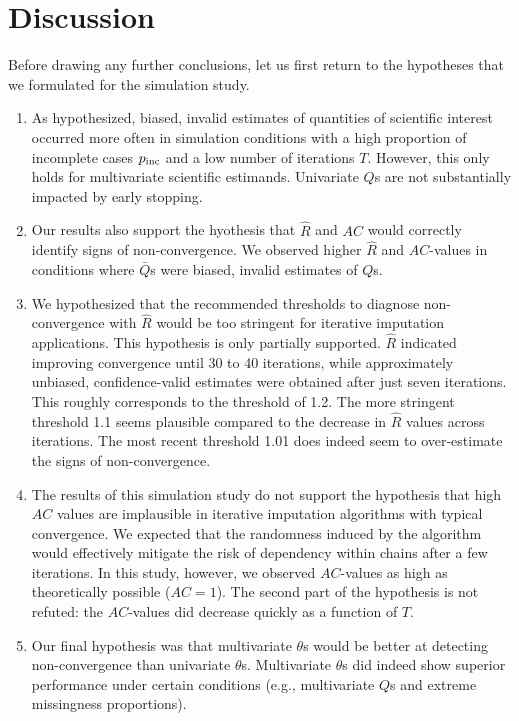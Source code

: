 \documentclass[Royal,times,sageh]{sagej}
\begin{document}
\hypertarget{discussion}{%
\section{Discussion}\label{discussion}}

Before drawing any further conclusions, let us first return to the hypotheses that we formulated for the simulation study.

\begin{enumerate}
\def\labelenumi{\arabic{enumi}.}
\item
  As hypothesized, biased, invalid estimates of quantities of scientific interest occurred more often in simulation conditions with a high proportion of incomplete cases \(p_{\rm inc}\) and a low number of iterations \(T\). However, this only holds for multivariate scientific estimands. Univariate \(Q\)s are not substantially impacted by early stopping.
\item
  Our results also support the hyothesis that \(\widehat{R}\) and \(AC\) would correctly identify signs of non-convergence. We observed higher \(\widehat{R}\) and \(AC\)-values in conditions where \(\bar{Q}\)s were biased, invalid estimates of \(Q\)s.
\item
  We hypothesized that the recommended thresholds to diagnose non-convergence with \(\widehat{R}\) would be too stringent for iterative imputation applications. This hypothesis is only partially supported. \(\widehat{R}\) indicated improving convergence until 30 to 40 iterations, while approximately unbiased, confidence-valid estimates were obtained after just seven iterations. This roughly corresponds to the threshold of 1.2. The more stringent threshold 1.1 seems plausible compared to the decrease in \(\widehat{R}\) values across iterations. The most recent threshold 1.01 does indeed seem to over-estimate the signs of non-convergence.
\item
  The results of this simulation study do not support the hypothesis that high \(AC\) values are implausible in iterative imputation algorithms with typical convergence. We expected that the randomness induced by the algorithm would effectively mitigate the risk of dependency within chains after a few iterations. In this study, however, we observed \(AC\)-values as high as theoretically possible (\(AC=1\)). The second part of the hypothesis is not refuted: the \(AC\)-values did decrease quickly as a function of \(T\).
\item
  Our final hypothesis was that multivariate \(\theta\)s would be better at detecting non-convergence than univariate \(\theta\)s. Multivariate \(\theta\)s did indeed show superior performance under certain conditions (e.g., multivariate \(Q\)s and extreme missingness proportions).
\end{enumerate}
\end{document}
